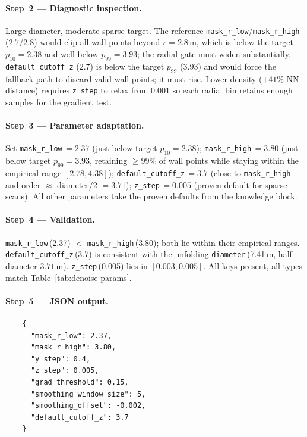 \documentclass[a4paper,fleqn]{cas-dc}
\begin{document}
{\paragraph{Step~2 --- Diagnostic inspection.}
Large-diameter, moderate-sparse target. The reference \texttt{mask\_r\_low}/\texttt{mask\_r\_high} ($2.7/2.8$) would clip all wall points beyond $r=2.8$\,m, which is below the target $p_{10}=2.38$ and well below $p_{99}=3.93$; the radial gate must widen substantially. \texttt{default\_cutoff\_z} (2.7) is below the target $p_{99}$ (3.93) and would force the fallback path to discard valid wall points; it must rise. Lower density ($+41\%$ NN distance) requires \texttt{z\_step} to relax from $0.001$ so each radial bin retains enough samples for the gradient test.

\paragraph{Step~3 --- Parameter adaptation.}
Set \texttt{mask\_r\_low}\,$=2.37$ (just below target $p_{10}=2.38$); \texttt{mask\_r\_high}\,$=3.80$ (just below target $p_{99}=3.93$, retaining $\geq 99\%$ of wall points while staying within the empirical range $[2.78, 4.38]$); \texttt{default\_cutoff\_z}\,$=3.7$ (close to \texttt{mask\_r\_high} and order $\approx$ diameter/2 $= 3.71$); \texttt{z\_step}\,$=0.005$ (proven default for sparse scans). All other parameters take the proven defaults from the knowledge block.

\paragraph{Step~4 --- Validation.}
\texttt{mask\_r\_low}\,(2.37) $<$ \texttt{mask\_r\_high}\,(3.80); both lie within their empirical ranges. \texttt{default\_cutoff\_z}\,(3.7) is consistent with the unfolding \texttt{diameter}\,(7.41\,m, half-diameter $3.71$\,m). \texttt{z\_step}\,(0.005) lies in $[0.003, 0.005]$. All keys present, all types match Table~\ref{tab:denoise-params}.

\paragraph{Step~5 --- JSON output.}
\begin{verbatim}
    {
      "mask_r_low": 2.37,
      "mask_r_high": 3.80,
      "y_step": 0.4,
      "z_step": 0.005,
      "grad_threshold": 0.15,
      "smoothing_window_size": 5,
      "smoothing_offset": -0.002,
      "default_cutoff_z": 3.7
    }
\end{verbatim}


}
\end{document}
